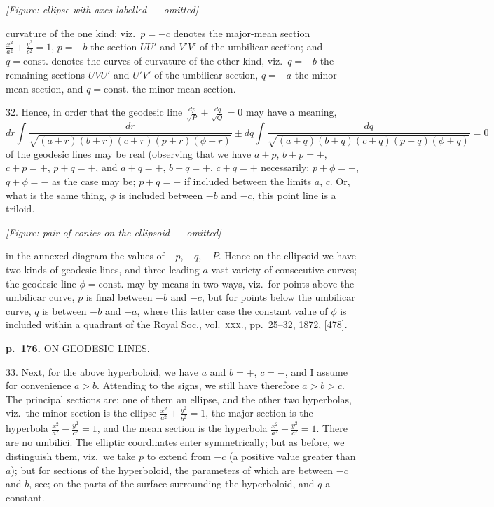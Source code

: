 \documentclass[11pt,a4paper]{book}
\begin{document}
\begin{center}
\textit{[Figure: ellipse with axes labelled --- omitted]}
\end{center}

curvature of the one kind; viz.\ $p = -c$ denotes the major-mean section $\frac{x^2}{a^2} + \frac{y^2}{c^2} = 1$, $p = -b$ the section $UU'$ and $V'V'$ of the umbilicar section; and $q = \mathrm{const.}$ denotes the curves of curvature of the other kind, viz.\ $q = -b$ the remaining sections $UVU'$ and $U'V'$ of the umbilicar section, $q = -a$ the minor-mean section, and $q = \mathrm{const.}$ the minor-mean section.

32. Hence, in order that the geodesic line $\frac{dp}{\sqrt{P}} \pm \frac{dq}{\sqrt{Q}} = 0$ may have a meaning,
\[
dr \int \frac{dr}{\sqrt{(a + r)(b + r)(c + r)(p + r)(\phi + r)}} \pm dq \int \frac{dq}{\sqrt{(a + q)(b + q)(c + q)(p + q)(\phi + q)}} = 0
\]
of the geodesic lines may be real (observing that we have $a + p$, $b + p = +$, $c + p = +$, $p + q = +$, and $a + q = +$, $b + q = +$, $c + q = +$ necessarily; $p + \phi = +$, $q + \phi = -$ as the case may be; $p + q = +$ if included between the limits $a$, $c$. Or, what is the same thing, $\phi$ is included between $-b$ and $-c$, this point line is a triloid.

\textit{[Figure: pair of conics on the ellipsoid --- omitted]}

in the annexed diagram the values of $-p$, $-q$, $-P$.  Hence on the ellipsoid we have two kinds of geodesic lines, and three leading $a$ vast variety of consecutive curves; the geodesic line $\phi = \mathrm{const.}$ may by means in two ways, viz.\ for points above the umbilicar curve, $p$ is final between $-b$ and $-c$, but for points below the umbilicar curve, $q$ is between $-b$ and $-a$, where this latter case the constant value of $\phi$ is included within a quadrant of the Royal Soc., vol.\ \textsc{xxx.}, pp.\ 25--32, 1872, [478].

\clearpage

\noindent
\textbf{p.~176.}  ON GEODESIC LINES.

33. Next, for the above hyperboloid, we have $a$ and $b = +$, $c = -$, and I assume for convenience $a > b$.  Attending to the signs, we still have therefore $a > b > c$. The principal sections are: one of them an ellipse, and the other two hyperbolas, viz.\ the minor section is the ellipse $\frac{x^2}{a^2} + \frac{y^2}{b^2} = 1$, the major section is the hyperbola $\frac{x^2}{a^2} - \frac{y^2}{c^2} = 1$, and the mean section is the hyperbola $\frac{x^2}{a^2} - \frac{y^2}{c^2} = 1$.  There are no umbilici. The elliptic coordinates enter symmetrically; but as before, we distinguish them, viz.\ we take $p$ to extend from $-c$ (a positive value greater than $a$); but for sections of the hyperboloid, the parameters of which are between $-c$ and $b$, see; on the parts of the surface surrounding the hyperboloid, and $q$ a constant.
\end{document}
